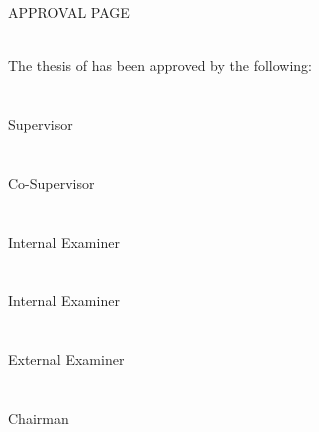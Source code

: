 \documentclass[a4paper]{memoir}
\begin{document}
  \thispagestyle{empty}

  \begin{center}
    \begin{LARGE}
      \MakeUppercase{Approval Page}
    \end{LARGE}\\[36pt]

    The thesis of \myName has been approved by the following:\\[48pt]
    \makebox[2in]{\dotfill}\\
    \mySupervisor\\
    Supervisor\\[48pt]
    
    \makebox[2in]{\dotfill}\\
    \myCoSupervisor\\
    Co-Supervisor\\[48pt]
    
    \makebox[2in]{\dotfill}\\
    \myInternalExaminerOne\\
    Internal Examiner\\[48pt]
    
    \makebox[2in]{\dotfill}\\
    \myInternalExaminerTwo\\
    Internal Examiner\\[48pt]
    
    \makebox[2in]{\dotfill}\\
    \myExternalExaminer\\
    External Examiner\\[48pt]
    
    \makebox[2in]{\dotfill}\\
    \myChairman\\
    Chairman\\[48pt]
  \end{center}
\end{document}
